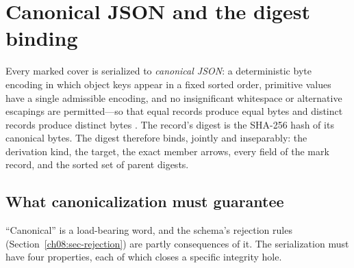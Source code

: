 \section{Canonical JSON and the digest binding}\label{ch08:sec-digest}

\begin{construction}\label{ch08:con-digest}
Every marked cover is serialized to \emph{canonical JSON}: a deterministic byte encoding in which object keys appear in a fixed sorted order, primitive values have a single admissible encoding, and no insignificant whitespace or alternative escapings are permitted---so that equal records produce equal bytes and distinct records produce distinct bytes \cite{jcs}. The record's digest is the SHA-256 hash of its canonical bytes. The digest therefore binds, jointly and inseparably: the derivation kind, the target, the exact member arrows, every field of the mark record, and the sorted set of parent digests.
\end{construction}

\subsection{What canonicalization must guarantee}

``Canonical'' is a load-bearing word, and the schema's rejection rules (Section~\ref{ch08:sec-rejection}) are partly consequences of it. The serialization must have four properties, each of which closes a specific integrity hole.

